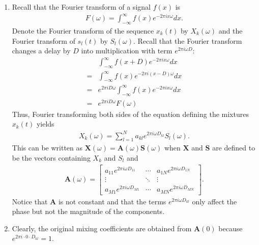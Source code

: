 \begin{enumerate}
\begin{solution}
    \begin{enumerate}
    \item Recall that the Fourier transform of a signal $f(x)$ is
      \begin{align*}
        F(\omega) = \int^{\infty}_{-\infty} f(x) e^{-2\pi i x \omega}
        dx.
      \end{align*}
      Denote the Fourier transform of the sequence $x_k(t)$ by $X_k(\omega)$ and
      the Fourier transform of $s_l(t)$ by $S_l(\omega)$.  Recall that the
      Fourier transform changes a delay by $D$ into multiplication with
      term $e^{2\pi i\omega D}$:
      \begin{align*}
        &\int^{\infty}_{-\infty} f(x+D) e^{-2\pi i x \omega} dx
        \\
        =& \int^{\infty}_{-\infty} f(x) e^{-2\pi i (x-D) \omega} dx
        \\
        =& e^{2\pi i D \omega} \int^{\infty}_{-\infty} f(x) e^{-2\pi i x \omega}
        dx
        \\
        =& e^{2\pi i D \omega}F(\omega)
      \end{align*}
      Thus, Fourier transforming both sides of the equation
      defining the mixtures $x_k(t)$ yields
      \begin{align*}
        X_k(\omega) = \sum_{l=1}^N a_{kl} e^{2\pi i\omega
          D_{kl}} S_l(\omega) .
      \end{align*}
      This can be written as $\mathbf{X}(\omega) = \mathbf{A}(\omega)
      \mathbf{S}(\omega)$ when $\mathbf{X}$ and $\mathbf{S}$ are defined to be the
      vectors containing $X_k$ and $S_l$ and
      \begin{align*}
        \mathbf{A}(\omega) =
        \begin{bmatrix}
          a_{11}e^{2\pi i\omega D_{11}} & \cdots & a_{1N}e^{2\pi i\omega D_{1N}}
          \\
          \vdots & \ddots & \vdots
          \\
          a_{M1}e^{2\pi i\omega D_{M1}} & \cdots & a_{MN}e^{2\pi i\omega D_{MN}}
        \end{bmatrix}.
      \end{align*}
      Notice that ${\mathbf A}$ is not constant and that the terms $e^{2\pi
        i\omega D_{kl}}$ only affect the phase but not the magnitude of the
      components.

    \item Clearly, the original mixing coefficients are obtained from
      $\mathbf{A}(0)$ because $e^{2\pi i \cdot 0 \cdot  D_{kl}}=1$.
    \end{enumerate}
  \end{solution}


\end{enumerate}
